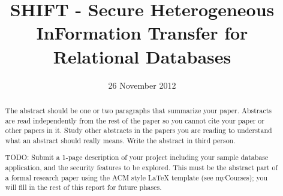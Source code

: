 \documentclass{sig-alternate}
\begin{document}
\title{SHIFT - Secure Heterogeneous InFormation Transfer for Relational Databases}
\author{
}
\date{26 November 2012}
\maketitle
\begin{abstract}
  The abstract should be one or two paragraphs that
  summarize your paper. Abstracts are read independently
  from the rest of the paper so you cannot cite your paper
  or other papers in it. Study other abstracts in the papers
  you are reading to understand what an abstract should
  really means. Write the abstract in third person.
  
  TODO: Submit a 1-page description of your project including your sample database 
application, and the security features to be explored. This must be the abstract 
part of a formal research paper using the ACM style LaTeX template (see
myCourses); you will fill in the rest of this report for future phases.
  
\end{abstract}

\begin{comment}
\begin{table}
\centering
\caption{Feelings about Issues}
\begin{tabular}{|l|r|l|} \hline
Flavor&Percentage&Comments\\ \hline
Issue 1 &  10\% & Loved it a lot\\ \hline
Issue 2 &  20\% & Disliked it immensely\\ \hline
Issue 3 &  30\% & Didn't care one bit\\ \hline
Issue 4 &  40\% & Duh?\\ \hline
\end{tabular}
\end{table}

\begin{figure}[htb]
\label{sample graphic}
\begin{center}
\texttt{[image: fly.jpg]}
\caption{A sample black \& white graphic (JPG).}
\end{center}
\end{figure}
\end{comment}



\balance
\end{document}
